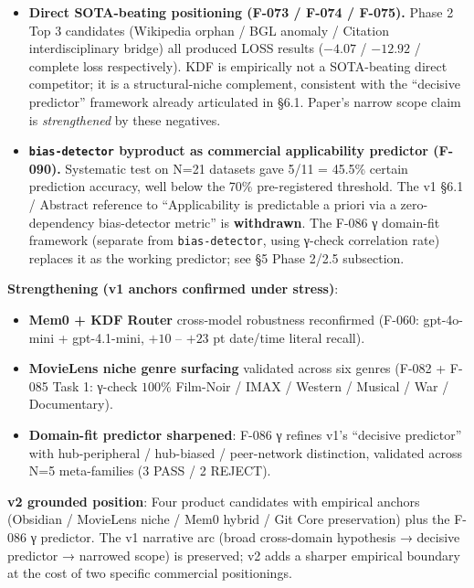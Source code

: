 \begin{itemize}
\tightlist
\item
  \textbf{Direct SOTA-beating positioning (F-073 / F-074 / F-075).} Phase 2
  Top 3 candidates (Wikipedia orphan / BGL anomaly / Citation
  interdisciplinary bridge) all produced LOSS results
  (\(-4.07\) / \(-12.92\) / complete loss respectively). KDF is empirically
  not a SOTA-beating direct competitor; it is a structural-niche
  complement, consistent with the ``decisive predictor'' framework
  already articulated in §6.1. Paper's narrow scope claim is
  \emph{strengthened} by these negatives.
\item
  \textbf{\texttt{bias-detector} byproduct as commercial applicability predictor
  (F-090).} Systematic test on N=21 datasets gave 5/11 = 45.5\% certain
  prediction accuracy, well below the 70\% pre-registered threshold. The
  v1 §6.1 / Abstract reference to ``Applicability is predictable a
  priori via a zero-dependency bias-detector metric'' is \textbf{withdrawn}.
  The F-086 γ domain-fit framework (separate from \texttt{bias-detector},
  using γ-check correlation rate) replaces it as the working predictor;
  see §5 Phase 2/2.5 subsection.
\end{itemize}

\textbf{Strengthening (v1 anchors confirmed under stress)}:

\begin{itemize}
\tightlist
\item
  \textbf{Mem0 + KDF Router} cross-model robustness reconfirmed
  (F-060: gpt-4o-mini + gpt-4.1-mini, \(+10\) -- \(+23\) pt date/time
  literal recall).
\item
  \textbf{MovieLens niche genre surfacing} validated across six genres
  (F-082 + F-085 Task 1: γ-check \(100\%\) Film-Noir / IMAX / Western /
  Musical / War / Documentary).
\item
  \textbf{Domain-fit predictor sharpened}: F-086 γ refines v1's ``decisive
  predictor'' with hub-peripheral / hub-biased / peer-network
  distinction, validated across N=5 meta-families (3 PASS / 2 REJECT).
\end{itemize}

\textbf{v2 grounded position}: Four product candidates with empirical anchors
(Obsidian / MovieLens niche / Mem0 hybrid / Git Core preservation) plus
the F-086 γ predictor. The v1 narrative arc (broad cross-domain hypothesis
→ decisive predictor → narrowed scope) is preserved; v2 adds a sharper
empirical boundary at the cost of two specific commercial positionings.

